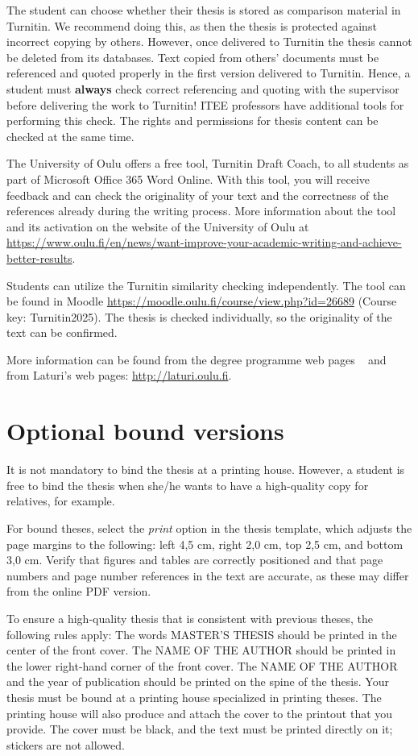 The student can choose whether their thesis is stored as comparison material
in Turnitin. We recommend doing this, as then
the thesis is protected against incorrect copying by others. However,
once delivered to Turnitin the thesis cannot be deleted from its
databases. Text copied from others’ documents must be referenced
and quoted properly in the first version delivered to Turnitin.
Hence, a student must \textbf{always} check correct referencing and
quoting with the supervisor before delivering the work to Turnitin!
ITEE professors have additional tools for performing this check. The
rights and permissions for thesis content can be checked at the same time.

The University of Oulu offers a free tool, Turnitin Draft Coach, to
all students as part of Microsoft Office 365 Word Online. With this
tool, you will receive feedback and can check the originality of your
text and the correctness of the references already during the writing
process.  More information about the tool and its activation on the
website of the University of Oulu at
\url{https://www.oulu.fi/en/news/want-improve-your-academic-writing-and-achieve-better-results}.

Students can utilize the Turnitin similarity checking independently.
The tool can be found in Moodle
\url{https://moodle.oulu.fi/course/view.php?id=26689} (Course key:
Turnitin2025). The thesis is checked individually, so the originality
of the text can be confirmed.

More information can be found from the degree programme web pages
~\cite{mscstudies} and from Laturi’s web pages: \url{http://laturi.oulu.fi}.

\section{Optional bound versions}
\label{boundversion}
It is not mandatory to bind the thesis at a printing house. However, a
student is free to bind the thesis when she/he wants to have a
high-quality copy for relatives, for example.

For bound theses, select the \textit{print} option in the thesis
template, which adjusts the page margins to the following: left 4,5
cm, right 2,0 cm, top 2,5 cm, and bottom 3,0 cm. Verify that figures
and tables are correctly positioned and that page numbers and page
number references in the text are accurate, as these may differ from
the online PDF version. 

To ensure a high-quality thesis that is consistent with previous
theses, the following rules apply: The words MASTER’S THESIS should be
printed in the center of the front cover. The NAME OF THE AUTHOR
should be printed in the lower right-hand corner of the front
cover. The NAME OF THE AUTHOR and the year of publication should be
printed on the spine of the thesis. Your thesis must be bound at a
printing house specialized in printing theses. The printing house will
also produce and attach the cover to the printout that you
provide. The cover must be black, and the text must be printed
directly on it; stickers are not allowed.

